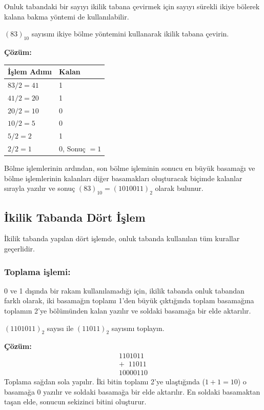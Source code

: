 Onluk tabandaki bir sayıyı ikilik tabana çevirmek için sayıyı sürekli ikiye bölerek kalana bakma yöntemi de kullanılabilir.

\begin{ornek}[A.4]
$(83)_{10}$ sayısını ikiye bölme yöntemini kullanarak ikilik tabana çevirin.

\textbf{Çözüm:}

\begin{table}[H]
\centering
\begin{tabular}{ll}
\toprule
\textbf{İşlem Adımı} & \textbf{Kalan} \\
\midrule
$83 / 2 = 41$ & 1 \\
$41 / 2 = 20$ & 1 \\
$20 / 2 = 10$ & 0 \\
$10 / 2 = 5$ & 0 \\
$5 / 2 = 2$ & 1 \\
$2 / 2 = 1$ & 0, Sonuç $= 1$ \\
\bottomrule
\end{tabular}
\end{table}

Bölme işlemlerinin ardından, son bölme işleminin sonucu en büyük basamağı ve bölme işlemlerinin kalanları diğer basamakları oluşturacak biçimde kalanlar sırayla yazılır ve sonuç $(83)_{10} = (1010011)_2$ olarak bulunur.
\end{ornek}

\subsection{İkilik Tabanda Dört İşlem}

İkilik tabanda yapılan dört işlemde, onluk tabanda kullanılan tüm kurallar geçerlidir.

\subsubsection*{Toplama işlemi:} 0 ve 1 dışında bir rakam kullanılamadığı için, ikilik tabanda onluk tabandan farklı olarak, iki basamağın toplamı 1'den büyük çıktığında toplam basamağına toplamın 2'ye bölümünden kalan yazılır ve soldaki basamağa bir elde aktarılır.

\begin{ornek}[A.5]
$(1101011)_2$ sayısı ile $(11011)_2$ sayısını toplayın.

\textbf{Çözüm:}
\[
\begin{array}{r}
  1101011 \\
+ \;\; 11011 \\
\hline
10000110
\end{array}
\]
Toplama sağdan sola yapılır. İki bitin toplamı 2'ye ulaştığında ($1+1=10$) o basamağa 0 yazılır ve soldaki basamağa bir elde aktarılır. En soldaki basamaktan taşan elde, sonucun sekizinci bitini oluşturur.
\end{ornek}

